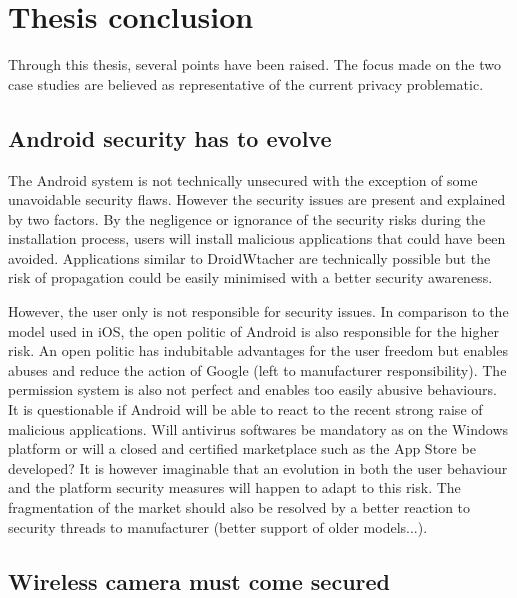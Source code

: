\chapter{Thesis conclusion}
\label{chap:thesis-ccl}


Through this thesis, several points have been raised.
The focus made on the two case studies are believed as representative of the current privacy problematic.

\section{Android security has to evolve}

The Android system is not technically unsecured with the exception of some unavoidable security flaws.
However the security issues are present and explained by two factors.
By the negligence or ignorance of the security risks during the installation process, users will install malicious applications that could have been avoided.
Applications similar to DroidWtacher are technically possible but the risk of propagation could be easily minimised with a better security awareness.

However, the user only is not responsible for security issues.
In comparison to the model used in iOS, the open politic of Android is also responsible for the higher risk.
An open politic has indubitable advantages for the user freedom but enables abuses and reduce the action of Google (left to manufacturer responsibility).
The permission system is also not perfect and enables too easily abusive behaviours.\\

It is questionable if Android will be able to react to the recent strong raise of malicious applications.
Will antivirus softwares be mandatory as on the Windows platform or will a closed and certified marketplace such as the App Store be developed?
It is however imaginable that an evolution in both the user behaviour and the platform security measures will happen to adapt to this risk.
The fragmentation of the market should also be resolved by a better reaction to security threads to manufacturer (better support of older models...).

\section{Wireless camera must come secured}

